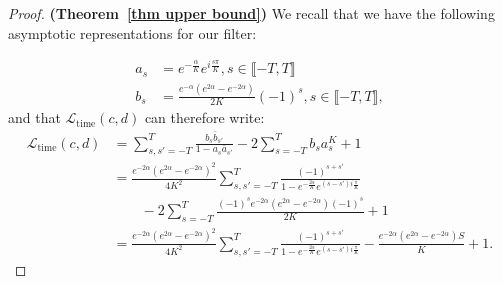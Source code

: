 \begin{proof}\textbf{(Theorem~\ref{thm upper bound})}\label{proof thm 15} \hspace*{.2cm}
    We recall that we have the following asymptotic representations for our filter:

\begin{align*}
    a_s &= e^{-\frac{\alpha}{K}}e^{i\frac{s\pi}{K}}, s\in\llbracket-T, T\rrbracket\\
    b_s &= \frac{e^{-\alpha}(e^{2\alpha}-e^{-2\alpha})}{2K}(-1)^s,s\in\llbracket-T, T\rrbracket,
\end{align*}
and that $\mathcal{L}_\text{time}(c, d)$ can therefore write:
\begin{align*}
    \mathcal{L}_\text{time}(c, d) &= \sum_{s, s'=-T}^T\frac{b_s\bar{b}_{s'}}{1-a_s\bar{a}_{s'}} - 2\sum_{s=-T}^Tb_sa_s^K + 1\\
    &= \frac{e^{-2\alpha}(e^{2\alpha}-e^{-2\alpha})^2}{4K^2}\sum_{s, s'=-T}^T\frac{(-1)^{s+s'}}{1 - e^{-\frac{2\alpha}{K}}e^{(s-s')i\frac{\pi}{K}}} \\
    &\qquad - 2\sum_{s=-T}^T\frac{(-1)^se^{-2\alpha}(e^{2\alpha}-e^{-2\alpha})(-1)^s}{2K} + 1\\
    &=  \frac{e^{-2\alpha}(e^{2\alpha}-e^{-2\alpha})^2}{4K^2}\sum_{s, s'=-T}^T\frac{(-1)^{s+s'}}{1 - e^{-\frac{2\alpha}{K}}e^{(s-s')i\frac{\pi}{K}}} - \frac{e^{-2\alpha}(e^{2\alpha}-e^{-2\alpha})S}{K} + 1.
\end{align*}


\end{proof}

